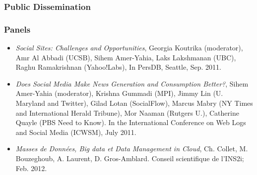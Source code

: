 \subsubsection{Public Dissemination}



\subsubsection*{Panels}

\begin{itemize}

\item \emph{Social Sites: Challenges and Opportunities}, Georgia Koutrika (moderator), Amr Al Abbadi (UCSB), Sihem Amer-Yahia, Laks Lakshmanan
  (UBC), Raghu Ramakrishnan (Yahoo!Labs), In PersDB, Seattle, Sep. 2011.

\item \emph{Does Social Media Make News Generation and Consumption Better?}, Sihem Amer-Yahia (moderator), Krishna Gummadi (MPI), Jimmy Lin
  (U. Maryland and Twitter), Gilad Lotan (SocialFlow), Marcus Mabry (NY Times and International Herald Tribune), Mor Naaman (Rutgers
  U.), Catherine Quayle (PBS Need to Know). In the International  Conference on Web Logs and Social Media (ICWSM), July 2011.




\item \emph{Masses de Donn{\'e}es, Big data et Data Management in Cloud}, Ch. Collet, M. Bouzeghoub, A. Laurent, D. Gros-Amblard. Conseil scientifique de l'INS2i; Feb. 2012. 

\end{itemize}

